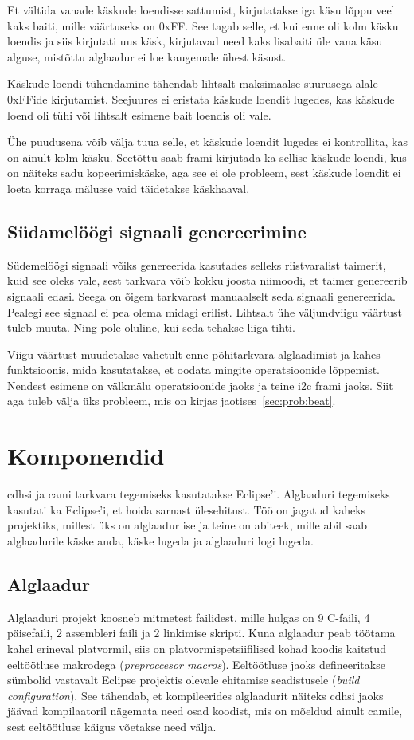 \documentclass[12pt,a4paper]{article}
\begin{document}
Et vältida vanade käskude loendisse sattumist, kirjutatakse iga käsu lõppu veel
kaks baiti, mille väärtuseks on 0xFF. See tagab selle, et kui enne oli kolm
käsku loendis ja siis kirjutati uus käsk, kirjutavad need kaks lisabaiti üle
vana käsu alguse, mistõttu alglaadur ei loe kaugemale ühest käsust.

Käskude loendi tühendamine tähendab lihtsalt maksimaalse suurusega alale
0xFFide kirjutamist. Seejuures ei eristata käskude loendit lugedes, kas
käskude loend oli tühi või lihtsalt esimene bait loendis oli vale.

Ühe puudusena võib välja tuua selle, et käskude loendit lugedes ei kontrollita,
kas on ainult kolm käsku. Seetõttu saab \gls{fram}i kirjutada ka sellise käskude
loendi, kus on näiteks sadu kopeerimiskäske, aga see ei ole probleem, sest
käskude loendit ei loeta korraga mälusse vaid täidetakse käskhaaval.


\subsection{Südamelöögi signaali genereerimine}
Südemelöögi signaali võiks genereerida kasutades selleks riistvaralist taimerit,
kuid see oleks vale, sest tarkvara võib kokku joosta niimoodi, et taimer
genereerib signaali edasi. Seega on õigem tarkvarast manuaalselt seda signaali
genereerida.  Pealegi see signaal ei pea olema midagi erilist. Lihtsalt ühe
väljundviigu väärtust tuleb muuta. Ning pole oluline, kui seda tehakse liiga
tihti.

Viigu väärtust muudetakse vahetult enne põhitarkvara alglaadimist ja kahes
funktsioonis, mida kasutatakse, et oodata mingite operatsioonide lõppemist.
Nendest esimene on välkmälu operatsioonide jaoks ja teine \gls{i2c} \gls{fram}i jaoks. Siit
aga tuleb välja üks probleem, mis on kirjas jaotises~\ref{sec:prob:beat}. 

\section{Komponendid}
\Gls{cdhs}i ja \gls{cam}i tarkvara tegemiseks kasutatakse Eclipse'i. Alglaaduri
tegemiseks kasutati ka Eclipse'i, et hoida sarnast ülesehitust. Töö on jagatud
kaheks projektiks, millest üks on alglaadur ise ja teine on abiteek, mille abil
saab alglaadurile käske anda, käske lugeda ja alglaaduri logi lugeda.

\subsection{Alglaadur}
Alglaaduri projekt koosneb mitmetest failidest, mille hulgas on 9 C-faili, 4
päisefaili, 2 assembleri faili ja 2 linkimise skripti. Kuna alglaadur peab
töötama kahel erineval platvormil, siis on platvormispetsiifilised kohad koodis
kaitstud eeltöötluse makrodega (\textit{preproccesor macros}). Eeltöötluse jaoks
defineeritakse sümbolid vastavalt Eclipse projektis olevale ehitamise
seadistusele (\textit{build configuration}). See tähendab, et kompileerides
alglaadurit näiteks \gls{cdhs}i jaoks jäävad kompilaatoril nägemata need osad
koodist, mis on mõeldud ainult \gls{cam}ile, sest eeltöötluse käigus võetakse
need välja.
\end{document}
